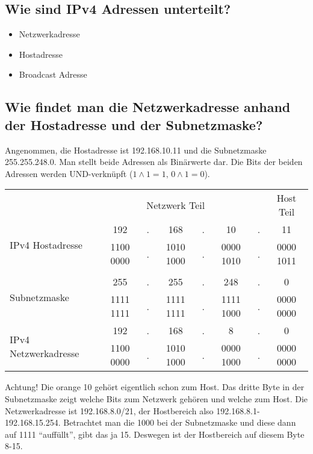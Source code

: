 \subsection*{Wie sind IPv4 Adressen unterteilt?}
\begin{itemize}
    \item Netzwerkadresse
    \item Hostadresse
    \item Broadcast Adresse
\end{itemize}

\subsection*{Wie findet man die Netzwerkadresse anhand der Hostadresse und der Subnetzmaske?}
Angenommen, die Hostadresse ist 192.168.10.11 und die Subnetzmaske 255.255.248.0. Man stellt beide Adressen als Binärwerte dar. Die Bits der beiden Adressen werden UND-verknüpft ($1\wedge1=1,\, 0\wedge1=0$).\\

\begin{tabularx}{\textwidth}{lccccccc}
    & \multicolumn{5}{c}{\cellcolor{lime}Netzwerk Teil}&&\cellcolor{violet!50}Host Teil\\
    \multirow{2}{*}{IPv4 Hostadresse}&\cellcolor{lime}192&\cellcolor{lime}.&\cellcolor{lime}168&\cellcolor{lime}.&\cellcolor{lime}\color{orange}10&.&\cellcolor{violet!50}11\\
    &1100 0000&.&1010 1000&.&0000 1010&.&0000 1011\\

    \multicolumn{8}{c}{}\\

    \multirow{2}{*}{Subnetzmaske}&255&.&255&.&248&.&\cellcolor{violet!50}0\\
    &\cellcolor{lime}1111 1111&\cellcolor{lime}.&\cellcolor{lime}1111 1111&\cellcolor{lime}.&\cellcolor{lime}1111 1\noindent\colorbox{violet!50}{000}&.&\cellcolor{violet!50}0000 0000\\

    \hline

    \multirow{2}{*}{IPv4 Netzwerkadresse}&192&.&168&.&8&.&0\\
    &1100 0000&.&1010 1000&.&0000 1000&.&0000 0000\\
\end{tabularx}
{\color{red}Achtung!} Die orange 10 gehört eigentlich schon zum Host. Das dritte Byte in der Subnetzmaske zeigt welche Bits zum Netzwerk gehören und welche zum Host. Die Netzwerkadresse ist 192.168.8.0/21, der Hostbereich also 192.168.8.1-192.168.15.254. Betrachtet man die 1000 bei der Subnetzmaske und diese dann auf 1111 "`auffüllt"', gibt das ja 15. Deswegen ist der Hostbereich auf diesem Byte 8-15.

